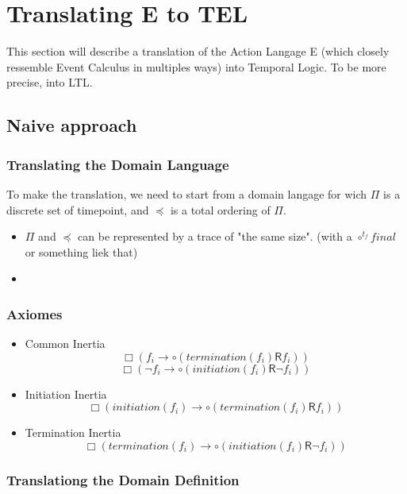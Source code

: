 \section{Translating E to TEL}\label{sec:etotemp}

This section will describe a translation of the Action Langage E (which closely ressemble Event Calculus in multiples ways) into Temporal Logic.
To be more precise, into LTL.

\subsection{Naive approach}

\subsubsection{Translating the Domain Language}

To make the translation, we need to start from a domain langage for wich $\Pi$ is a discrete set of timepoint, and $\preceq$ is a total ordering of $\Pi$.

\begin{itemize}
  \item $\Pi$ and $\preceq$ can be represented by a trace of "the same size". (with a $\circ^{t_f}final$ or something liek that)
  \item
\end{itemize}

\subsubsection{Axiomes}

\begin{itemize}
  \item Common Inertia
  $$\Box(f_i\rightarrow\circ (termination(f_i) \mathbin{\bm{\mathsf{R}}} f_i))$$
  $$\Box(\neg f_i\rightarrow\circ (initiation(f_i) \mathbin{\bm{\mathsf{R}}} \neg f_i))$$
  \item Initiation Inertia $$\Box(initiation(f_i)\rightarrow\circ (termination(f_i) \mathbin{\bm{\mathsf{R}}} f_i))$$
  \item Termination Inertia $$\Box(termination(f_i)\rightarrow\circ (initiation(f_i) \mathbin{\bm{\mathsf{R}}} \neg f_i))$$
\end{itemize}

\subsubsection{Translationg the Domain Definition}

